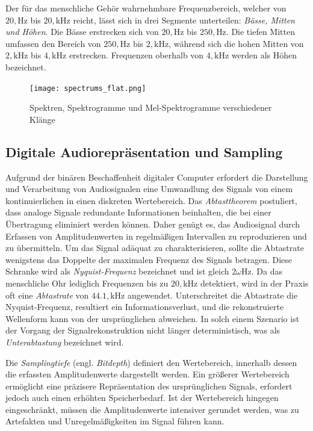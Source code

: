 \documentclass[
  a4paper,  %
  twoside,  %
  bibliography=totoc,
  headsepline,
  cleardoublepage=empty,
  parskip=half,
  draft=false
]{scrbook}
\begin{document}
Der für das menschliche Gehör wahrnehmbare Frequenzbereich, welcher von $20 , \text{Hz}$ bis $20 , \text{kHz}$ reicht, lässt sich in drei Segmente unterteilen: \emph{Bässe, Mitten und Höhen}. Die Bässe erstrecken sich von $20 , \text{Hz}$ bis $250 , \text{Hz}$. Die tiefen Mitten umfassen den Bereich von $250 , \text{Hz}$ bis $2 , \text{kHz}$, während sich die hohen Mitten von $2 , \text{kHz}$ bis $4 , \text{kHz}$ erstrecken. Frequenzen oberhalb von $4 , \text{kHz}$ werden als Höhen bezeichnet. \cite{raffaseder_audiodesign_2010}

\begin{figure}
  \centering
  \texttt{[image: spectrums\_flat.png]}
  \caption[Spektren, Spektrogramme und Mel-Spektrogramme]{Spektren, Spektrogramme und Mel-Spektrogramme verschiedener Klänge}
  \label{fig:spectro}
\end{figure}


\subsection{Digitale Audiorepräsentation und Sampling}

Aufgrund der binären Beschaffenheit digitaler Computer erfordert die Darstellung und Verarbeitung von Audiosignalen eine Umwandlung des Signals von einem kontinuierlichen in einen diskreten Wertebereich. Das \emph{Abtasttheorem} postuliert, dass analoge Signale redundante Informationen beinhalten, die bei einer Übertragung eliminiert werden können. Daher genügt es, das Audiosignal durch Erfassen von Amplitudenwerten in regelmäßigen Intervallen zu reproduzieren und zu übermitteln. Um das Signal adäquat zu charakterisieren, sollte die Abtastrate wenigstens das Doppelte der maximalen Frequenz des Signals betragen. Diese Schranke wird als \emph{Nyquist-Frequenz} bezeichnet und ist gleich $2 \omega \mathrm{Hz}$. Da das menschliche Ohr lediglich Frequenzen bis zu $20 , \text{kHz}$ detektiert, wird in der Praxis oft eine \emph{Abtastrate} von $44.1 , \text{kHz}$ angewendet. Unterschreitet die Abtastrate die Nyquist-Frequenz, resultiert ein Informationsverlust, und die rekonstruierte Wellenform kann von der ursprünglichen abweichen. In solch einem Szenario ist der Vorgang der Signalrekonstruktion nicht länger deterministisch, was als \emph{Unterabtastung} bezeichnet wird. \cite{lai_practical_2004, shannon_communication_1949, ruschkowski_elektronische_2019}

Die \emph{Samplingtiefe} (engl. \emph{Bitdepth}) definiert den Wertebereich, innerhalb dessen die erfassten Amplitudenwerte dargestellt werden. Ein größerer Wertebereich ermöglicht eine präzisere Repräsentation des ursprünglichen Signals, erfordert jedoch auch einen erhöhten Speicherbedarf. Ist der Wertebereich hingegen eingeschränkt, müssen die Amplitudenwerte intensiver gerundet werden, was zu Artefakten und Unregelmäßigkeiten im Signal führen kann. \cite{thompson_understanding_2005}
\end{document}

